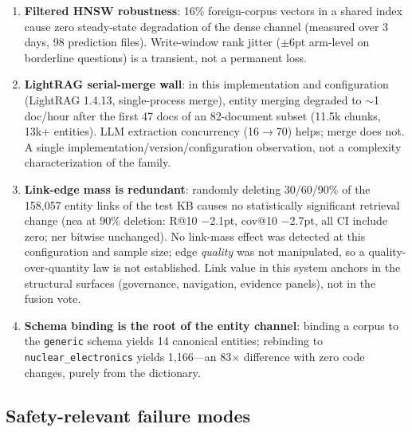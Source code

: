\documentclass[sigconf,nonacm]{acmart}
\begin{document}
\begin{enumerate}
\item \textbf{Filtered HNSW robustness}: 16\% foreign-corpus vectors in a
shared index cause zero steady-state degradation of the dense channel
(measured over 3 days, 98 prediction files). Write-window rank jitter
($\pm$6pt arm-level on borderline questions) is a transient, not a permanent
loss.

\item \textbf{LightRAG serial-merge wall}: in this implementation and configuration
(LightRAG 1.4.13, single-process merge), entity merging degraded to
${\sim}$1 doc/hour after the first 47 docs of an 82-document subset
(11.5k chunks, 13k+ entities). LLM extraction concurrency (16$\to$70)
helps; merge does not. A single implementation/version/configuration
observation, not a complexity characterization of the family.

\item \textbf{Link-edge mass is redundant}: randomly deleting 30/60/90\% of
the 158{,}057 entity links of the test KB causes no statistically
significant retrieval change (nea at 90\% deletion: R@10 $-$2.1pt, cov@10
$-$2.7pt, all CI include zero; ner bitwise unchanged). No link-mass effect was detected at this configuration and sample
size; edge \emph{quality} was not manipulated, so a
quality-over-quantity law is not established. Link value in this system
anchors in the structural surfaces (governance, navigation, evidence
panels), not in the fusion vote.

\item \textbf{Schema binding is the root of the entity channel}: binding a
corpus to the \texttt{generic} schema yields 14 canonical entities;
rebinding to \texttt{nuclear\_electronics} yields 1{,}166---an 83$\times$
difference with zero code changes, purely from the dictionary.
\end{enumerate}

\subsection{Safety-relevant failure modes}
\end{document}
